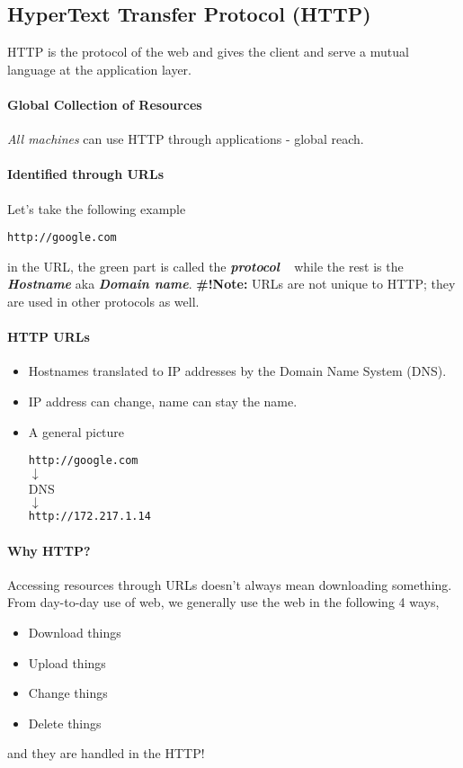 \documentclass[10pt]{article}
\begin{document}
\subsection{HyperText Transfer Protocol (HTTP)}
HTTP is the protocol of the web and gives the client and serve a mutual language at the application layer. 
\paragraph{Global Collection of Resources} \textit{All machines} can use HTTP through applications - global reach.

\paragraph{Identified through URLs} Let's take the following example
\begin{center}
    \texttt{\color{Green}http://\color{Black}google.com}
\end{center}
in the URL, \color{Green}the green part is called the \textit{\textbf{protocol}} ~\color{Black} while the rest is the \textit{\textbf{Hostname}} aka \textit{\textbf{Domain name}}. \textbf{\#!Note:} URLs are not unique to HTTP; they are used in other protocols as well. 

\paragraph{HTTP URLs}
\begin{itemize}
    \item Hostnames translated to IP addresses by the Domain Name System (DNS).
    \item IP address can change, name can stay the name.
    \item A general picture
    \begin{mdframed}
        \begin{center}
            \texttt{http://google.com} \\
            $\downarrow$\\ 
            DNS\\
            $\downarrow$\\
            \texttt{http://172.217.1.14}
        \end{center}
    \end{mdframed}
\end{itemize}

\paragraph{Why HTTP?} Accessing resources through URLs doesn't always mean downloading something. From day-to-day use of web, we generally use the web in the following 4 ways,
\begin{itemize}
    \item Download things
    \item Upload things
    \item Change things
    \item Delete things
\end{itemize}
and they are handled in the HTTP!
\end{document}
